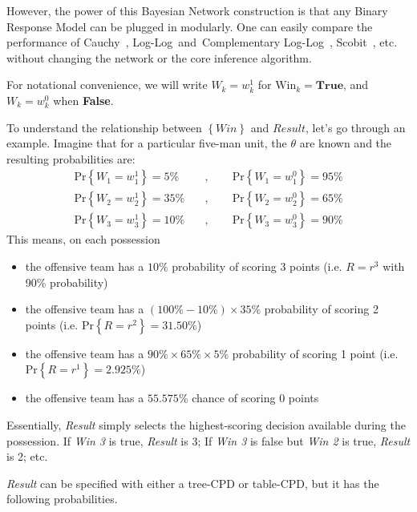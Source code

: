 \documentclass[10pt,twocolumn]{article}
\newcommand{\prb}[1]{\ensuremath{  \mathrm{Pr}\left\{ #1 \right\}  }}
\begin{document}
However, the power of this Bayesian Network construction is that any Binary Response Model can be plugged in modularly.
One can easily compare the performance of Cauchy~\cite{franklinPolisciWiscEduMLELec07p4up}, Log-Log~and~Complementary Log-Log~\cite{long1997regression}, Scobit~\cite{nagler1994scobit}, etc. without changing the network or the core inference algorithm.


For notational convenience, we will write $W_k = w_k^1$ for $\mathrm{Win}_k = \mathbf{True}$, and $W_k = w_k^0$ when {\bf False}.

To understand the relationship between $\left\{Win\right\}$ and $Result$, let's go through an example.
Imagine that for a particular five-man unit, the $\theta$ are known and the resulting probabilities are:
\begin{align*}
\prb{W_1=w_1^1} = 5\% \quad&, \quad\quad \prb{W_1=w_1^0} = 95\%
\\
\prb{W_2=w_2^1} = 35\% \quad&, \quad\quad \prb{W_2=w_2^0} = 65\%
\\
\prb{W_3=w_3^1} = 10\% \quad&, \quad\quad \prb{W_3=w_3^0} = 90\%
\end{align*}%
This means, on each possession
\begin{itemize}
\item the offensive team has a $10\%$ probability of scoring 3 points (i.e. $R=r^3$ with 90\% probability)
\item the offensive team has a $\left(100\% - 10\%\right) \times 35\%$ probability of scoring 2 points (i.e. $\prb{R=r^2}=31.50\%$)
\item the offensive team has a $90\% \times 65\% \times 5\%$ probability of scoring 1 point (i.e. $\prb{R=r^1}=2.925\%$)
\item the offensive team has a $55.575\%$ chance of scoring 0 points
\end{itemize}

Essentially, \emph{Result} simply selects the highest-scoring decision available during the possession.
If \emph{Win 3} is true, \emph{Result} is 3; If \emph{Win 3} is false but \emph{Win 2} is true, \emph{Result} is 2; etc.

\emph{Result} can be specified with either a tree-CPD or table-CPD, but it has the following probabilities.
\end{document}
